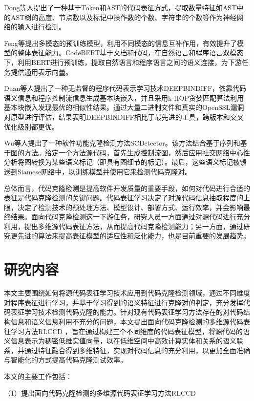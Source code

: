 Dong等人\cite{9148302}提出了一种基于Token和AST的代码表征方式，提取数量特征如AST中的AST树的高度、节点数以及标记中操作数的个数、字符串的个数等作为神经网络的输入进行检测。

Feng等\cite{Feng2020CodeBERTAP}提出多模态的预训练模型，利用不同模态的信息互补作用，有效提升了模型的整体表征能力。CodeBERT基于文档和代码，在自然语言和程序语言双模态下，利用BERT进行预训练，提取自然语言和程序语言之间的语义连接，为下游任务提供通用表示向量。

Duan等人\cite{WOS:000680742600067}提出了一种无监督的程序代码表示学习技术DEEPBINDIFF，依靠代码语义信息和程序控制流信息生成基本块嵌入，并且采用k-HOP贪婪匹配算法利用基本块嵌入发现最优的相似性结果。通过大量二进制文件和真实的OpenSSL漏洞对原型进行评估，结果表明DEEPBINDIFF相比于最先进的工具，跨版本和交叉优化级别都更优。

Wu等人\cite{10.1145/3324884.3416562}提出了一种软件功能克隆检测方法SCDetector。该方法结合基于序列和基于图的方法。给定一个方法源代码，首先生成控制流图，然后应用社交网络中心性分析将图转换为某些语义标记（即具有图细节的标记）。最后，这些语义标记被馈送到Siamese网络中，以训练模型并使用它来检测代码克隆对。

总体而言，代码克隆检测是提高软件开发质量的重要手段，如何对代码进行合适的表征是代码克隆检测的关键问题\cite{JSYJ20240123005}。代码表征学习决定了对源代码信息抽取程度的上限，决定了检测技术的预处理方法、模型设计、部署方式、运行效率，并会影响最终结果。面向代码克隆检测这一下游任务，研究人员一方面通过对源代码进行充分利用，提出多维源代码表征方法，从而提高代码克隆检测能力；另一方面，通过研究更先进的算法来提高表征模型的适应性和泛化能力，也是目前重要的发展趋势。

\section{研究内容}
\label{sec:Content}
本文主要围绕如何将源代码表征学习技术应用到代码克隆检测领域，通过不同维度对程序表征进行学习，并基于学习得到的语义特征进行克隆对的判定，充分发挥代码表征学习技术检测代码克隆的能力。针对现有代码表征学习方法存在的对代码结构信息和语义信息利用不充分的问题，本文提出面向代码克隆检测的多维源代码表征学习方法RLCCD ，旨在通过构建三个不同维度的代码表征模型，将源代码的语义信息表示为稠密低维实值向量，以在低维空间中高效计算实体和关系的语义联系，并通过特征融合得到多维特征，实现对代码信息的充分利用，以更加全面准确与智能化的方式提高代码克隆测试效率。

本文的主要工作包括：

（1）提出面向代码克隆检测的多维源代码表征学习方法RLCCD 

